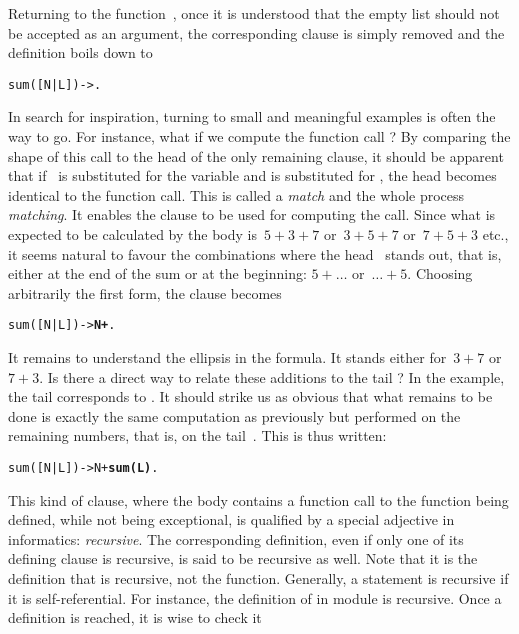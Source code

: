 Returning to the function~, once it is understood that
the empty list should not be accepted as an argument, the
corresponding clause is simply removed and the definition boils down
to
\begin{alltt}
sum([N|L]) -> .
\end{alltt}
In search for inspiration, turning to small and meaningful examples is
often the way to go. For instance, what if we compute the function
call ? By comparing the shape of this
call to the head of the only remaining clause, it should be apparent
that if~ is substituted for the variable  and
 is substituted for , the head becomes
identical to the function call. This is called a \emph{match} and the
whole process \emph{matching}. It enables the clause to be used for
computing the call. Since what is expected to be calculated by the
body is~\(5 + 3 + 7\) or~\(3 + 5 + 7\) or~\(7 + 5 + 3\) etc., it seems
natural to favour the combinations where the head~ stands
out, that is, either at the end of the sum or at the beginning: \(5 +
\dots\) or~\(\ldots + 5\). Choosing arbitrarily the first form, the
clause becomes
\begin{alltt}
sum([N|L]) -> \textbf{N +} .
\end{alltt}
\noindent It remains to understand the ellipsis in the formula. It
stands either for~\(3 + 7\) or~\(7 + 3\). Is there a direct way to
relate these additions to the tail ? In the example, the
tail corresponds to . It should strike us as
obvious that what remains to be done is exactly the same computation
as previously but performed on the remaining numbers, that is, on the
tail~. This is thus written:
\begin{alltt}
sum([N|L]) -> N + \textbf{sum(L)}.\hfill% \emph{A recursive call}
\end{alltt}
\noindent This kind of clause, where the body contains a function call
to the function being defined, while not being exceptional, is
qualified by a special adjective in informatics: \emph{recursive}. The
corresponding definition, even if only one of its defining clause is
recursive, is said to be recursive as well. Note that it is the
definition that is recursive, not the function. Generally, a statement
is recursive if it is self\hyp{}referential. For instance, the
definition of  in module  is
recursive. Once a definition is reached, it is wise to check it
